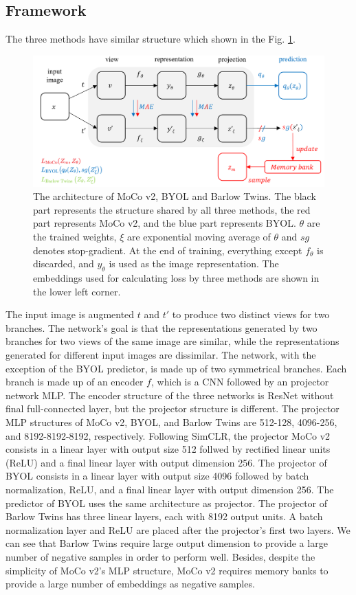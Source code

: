 \documentclass[conference]{IEEEtran}
\begin{document}
\subsection{Framework}
The three methods have similar structure which shown in the Fig. \ref{fig:architecture}.
\begin{figure}[t]
\centerline{\includegraphics[scale=0.51]{images/frameworks.png}}
\caption{The architecture of MoCo v2, BYOL and Barlow Twins. The black part represents the structure shared by all three methods, the red part represents MoCo v2, and the blue part represents BYOL. $\theta$ are the trained weights, $\xi$ are exponential moving average of $\theta$ and $sg$ denotes stop-gradient. At the end of training, everything except  $f_\theta$ is discarded, and $y_\theta$ is used as the image representation. The embeddings used for calculating loss by three methods are shown in the lower left corner. }
\label{fig:architecture}
\end{figure}
The input image is augmented $t$ and $t'$ to produce two distinct views for two branches. The network's goal is that the representations generated by two branches for two views of the same image are similar, while the representations generated for different input images are dissimilar.
The network, with the exception of the BYOL predictor, is made up of two symmetrical branches. Each branch is made up of an encoder $f$, which is a CNN followed by an projector network MLP.
The encoder structure of the three networks is ResNet without final full-connected layer, but the projector structure is different. The projector MLP structures of MoCo v2, BYOL, and Barlow Twins are 512-128, 4096-256, and 8192-8192-8192, respectively.
Following SimCLR, the projector MoCo v2 consists in a linear layer with output size 512 follwed by rectified linear units (ReLU) and a final linear layer with output dimension 256.
The projector of BYOL consists in a linear layer with output size 4096 followed by batch normalization, ReLU, and a final linear layer with output dimension 256. The predictor of BYOL uses the same architecture as projector.
The projector of Barlow Twins has three linear layers, each with 8192 output units. A batch normalization layer and ReLU are placed after the projector's first two layers.
We can see that Barlow Twins require large output dimension to provide a large number of negative samples in order to perform well. Besides, despite the simplicity of MoCo v2's MLP structure, MoCo v2 requires memory banks to provide a large number of embeddings as negative samples. 
\end{document}

